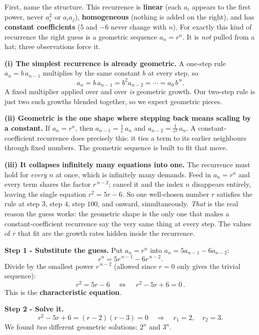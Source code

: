 \documentclass[11pt,a4paper]{article}
\begin{document}
\begin{ideabox}
First, name the structure. This recurrence is \textbf{linear} (each $a_i$ appears to the
first power, never $a_i^2$ or $a_ia_j$), \textbf{homogeneous} (nothing is added on the
right), and has \textbf{constant coefficients} ($5$ and $-6$ never change with $n$). For
exactly this kind of recurrence the right guess is a geometric sequence $a_n=r^n$. It is
\emph{not} pulled from a hat; three observations force it.

\textbf{(i) The simplest recurrence is already geometric.} A one-step rule $a_n=b\,a_{n-1}$
multiplies by the same constant $b$ at every step, so
\[
a_n=b\,a_{n-1}=b^2a_{n-2}=\cdots=a_0\,b^{\,n}.
\]
A fixed multiplier applied over and over \emph{is} geometric growth. Our two-step rule is
just two such growths blended together, so we expect geometric pieces.

\textbf{(ii) Geometric is the one shape where stepping back means scaling by a constant.}
If $a_n=r^n$, then $a_{n-1}=\tfrac1r\,a_n$ and $a_{n-2}=\tfrac1{r^2}\,a_n$. A
constant-coefficient recurrence does precisely this: it ties a term to its earlier
neighbours through fixed numbers. The geometric sequence is built to fit that move.

\textbf{(iii) It collapses infinitely many equations into one.} The recurrence must hold
for \emph{every} $n$ at once, which is infinitely many demands. Feed in $a_n=r^n$ and every term
shares the factor $r^{\,n-2}$; cancel it and the index $n$ disappears entirely, leaving the
single equation $r^2=5r-6$. So one well-chosen number $r$ satisfies the rule at step $3$,
step $4$, step $100$, and onward, simultaneously. \emph{That} is the real reason the guess
works: the geometric shape is the only one that makes a constant-coefficient recurrence say
the very same thing at every step. The values of $r$ that fit are the growth rates hidden
inside the recurrence.
\end{ideabox}

\textbf{Step 1 - Substitute the guess.}
Put $a_n=r^n$ into $a_n=5a_{n-1}-6a_{n-2}$:
\[
r^n = 5r^{\,n-1} - 6r^{\,n-2}.
\]
Divide by the smallest power $r^{\,n-2}$ (allowed since $r=0$ only gives the trivial
sequence):
\[
r^2 = 5r - 6 \quad\Longleftrightarrow\quad \boxed{\,r^2 - 5r + 6 = 0\,}.
\]
This is the \textbf{characteristic equation}.

\textbf{Step 2 - Solve it.}
\[
r^2-5r+6=(r-2)(r-3)=0 \quad\Longrightarrow\quad r_1=2,\quad r_2=3.
\]
We found \emph{two} different geometric solutions: $2^n$ and $3^n$.
\end{document}
